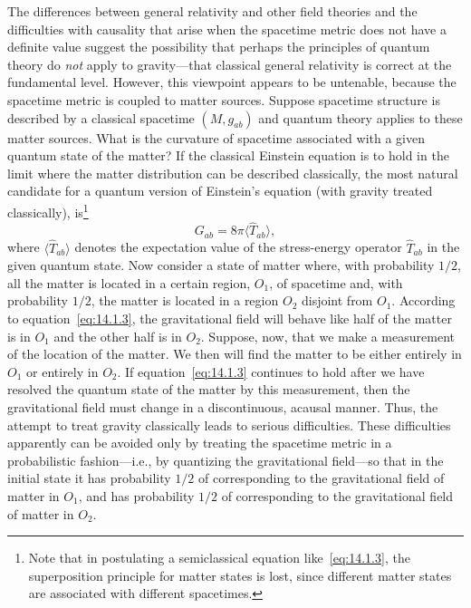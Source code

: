 The differences between general relativity and other field theories and the
difficulties with causality that arise when the spacetime metric does not have a
definite value suggest the possibility that perhaps the principles of quantum theory
do \emph{not} apply to gravity---that classical general relativity is correct at the fundamental
level. However, this viewpoint appears to be untenable, because the spacetime
metric is coupled to matter sources. Suppose spacetime structure is described by a
classical spacetime \((M,g_{ab})\) and quantum theory applies to these matter sources.
What is the curvature of spacetime associated with a given quantum state of the
matter? If the classical Einstein equation is to hold in the limit where the matter
distribution can be described classically, the most natural candidate for a quantum
version of Einstein's equation (with gravity treated classically), is\footnote{Note that
in postulating a semiclassical equation like~\eqref{eq:14.1.3}, the superposition
principle for matter states is lost, since different matter states are associated with
different spacetimes.}
\begin{equation}
  G_{ab}=8\pi\langle\widehat T_{ab}\rangle,
  \tag{14.1.3}\label{eq:14.1.3}
\end{equation}
where \(\langle\widehat T_{ab}\rangle\) denotes the expectation value of the stress-energy operator
\(\widehat T_{ab}\) in the given quantum state. Now consider a state of matter where, with
probability \(1/2\), all the matter is located in a certain region, \(O_1\), of spacetime and,
with probability \(1/2\), the matter is located in a region \(O_2\) disjoint from \(O_1\).
According to equation~\eqref{eq:14.1.3}, the gravitational field will behave like half of the matter is
in \(O_1\) and the other half is in \(O_2\). Suppose, now, that we make a measurement of the
location of the matter. We then will find the matter to be either entirely in \(O_1\) or entirely
in \(O_2\). If equation~\eqref{eq:14.1.3} continues to hold after we have resolved the quantum
state of the matter by this measurement, then the gravitational field must change in a
discontinuous, acausal manner. Thus, the attempt to treat gravity classically leads to
serious difficulties. These difficulties apparently can be avoided only by treating the
spacetime metric in a probabilistic fashion---i.e., by quantizing the gravitational field---so
that in the initial state it has probability \(1/2\) of corresponding to the gravitational field
of matter in \(O_1\), and has probability \(1/2\) of corresponding to the gravitational field
of matter in \(O_2\).

